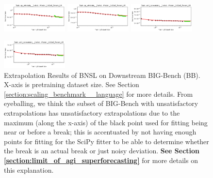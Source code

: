 \documentclass{article} %
\begin{document}
\begin{figure}[]
\vspace{-0.5mm}

\hspace*{-1.0mm}\includegraphics[width=0.2975\textwidth]{figures/scaling_laws_benchmark_dataset_plots/__qa_wikidata_,__1-shot_____262M.png}
\hspace*{1.0mm}\includegraphics[width=0.2975\textwidth]{figures/scaling_laws_benchmark_dataset_plots/__qa_wikidata_,__2-shot_____262M.png}
\hspace*{1.0mm}\includegraphics[width=0.2975\textwidth]{figures/scaling_laws_benchmark_dataset_plots/__unit_conversion_,__1-shot_____262M.png}

\vspace{-0.5mm}

\includegraphics[width=0.2975\textwidth]{figures/scaling_laws_benchmark_dataset_plots/__unit_conversion_,__2-shot_____262M.png}
\vspace{-4.1mm}
    \caption{
    Extrapolation Results of BNSL on Downstream BIG-Bench (BB). X-axis is pretraining dataset size. See Section \ref{section:scaling_benchmark__language} for more details. From eyeballing, we think the subset of BIG-Bench with unsatisfactory extrapolations has unsatisfactory extrapolations due to the maximum (along the x-axis) of the black point used for fitting being near or before a break; this is accentuated by not having enough points for fitting for the SciPy fitter to be able to determine whether the break is an actual break or just noisy deviation. \textbf{See Section \ref{section:limit_of_agi_superforecasting}} for more details on this explanation.
    }
    \label{fig:scaling_laws_benchmark_dataset__big_bench}
\end{figure}
\end{document}
